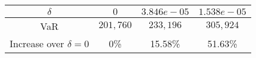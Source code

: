 \begin{center}
\begin{tabular}{c|c|c|c}
\(\delta\) & \(0\) & \(3.846e-05\) & \(1.538e-05\)\\
\hline
VaR & \(201,760\) & \(233,196\) & \(305,924\) \\
Increase over \(\delta=0\) & 0\% & 15.58\% & 51.63\%
\end{tabular}
\end{center}
 \label{table1}